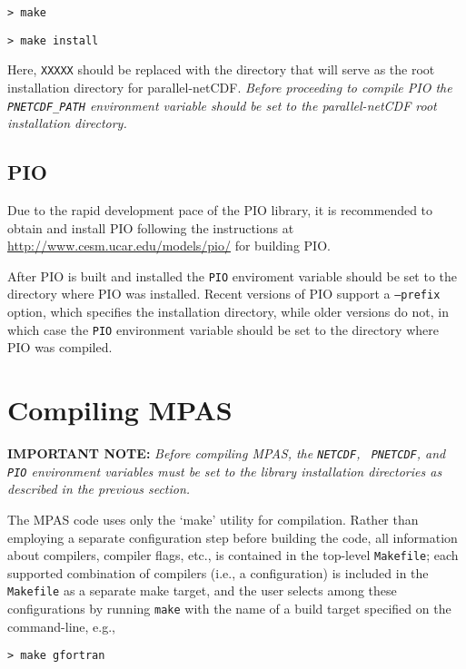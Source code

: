 {\tt > make}

{\tt > make install}
\vspace{12pt}

Here, {\tt XXXXX} should be replaced with the directory that will serve as the
root installation directory for parallel-netCDF.  {\em Before proceeding to
compile PIO the {\tt PNETCDF\_PATH} environment variable should be set to the
parallel-netCDF root installation directory.}


\subsection{PIO}
\label{pio_build}

Due to the rapid development pace of the PIO library, it is recommended to
obtain and install PIO following the instructions at
\url{http://www.cesm.ucar.edu/models/pio/} for building PIO.

After PIO is built and installed the {\tt PIO} enviroment variable should be set to 
the directory where PIO was installed. Recent versions of PIO support a {\tt --prefix}
option, which specifies the installation directory, while older versions do not,
in which case the {\tt PIO} environment variable should be set to the directory where
PIO was compiled.

\section{Compiling MPAS}
\label{compiling_MPAS}

{\bf IMPORTANT NOTE:} {\em Before compiling MPAS, the {\tt NETCDF}, {\tt
PNETCDF}, and {\tt PIO} environment variables must be set to the library
installation directories as described in the previous section.} \vspace{12pt}

The MPAS code uses only the `make' utility for compilation. Rather than
employing a separate configuration step before building the code, all
information about compilers, compiler flags, etc., is contained in the top-level
{\tt Makefile}; each supported combination of compilers (i.e., a configuration)
is included in the {\tt Makefile} as a separate make target, and the user
selects among these configurations by running {\tt make} with the name of a
build target specified on the command-line, e.g.,

\vspace{12pt}
{\tt > make gfortran}
\vspace{12pt}

